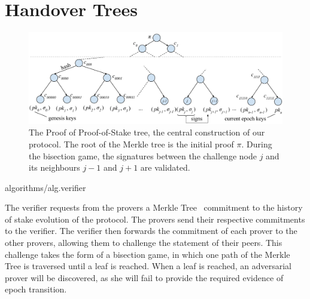\section{Handover Trees}

\begin{figure}[h]
    \centering
    \includegraphics[width=0.8 \textwidth,keepaspectratio]{figures/popos-tree.pdf}
    \caption{The Proof of Proof-of-Stake tree, the central construction of our protocol.
             The root of the Merkle tree is the initial proof $\pi$. During the bisection
             game, the signatures between the challenge node $j$ and its neighbours
             $j-1$ and $j+1$ are validated.}
    \label{fig.popos-tree}
\end{figure}

{algorithms/alg.verifier}

The verifier requests from
the provers a Merkle Tree~\cite{merkle} commitment to the history of stake evolution of
the protocol. The provers send their respective commitments to the verifier. The verifier
then forwards the commitment of each prover to the other provers, allowing them to
challenge the statement of their peers. This challenge takes the form of a bisection
game, in which one path of the Merkle Tree is traversed until a leaf is reached.
When a leaf is reached, an adversarial prover will be discovered, as she will fail to provide
the required evidence of epoch transition. 
